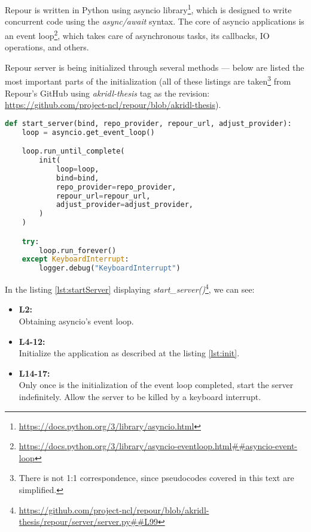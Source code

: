 \documentclass[../main.tex]{subfiles}
\begin{document}
Repour is written in Python using asyncio library\footnote{\url{https://docs.python.org/3/library/asyncio.html}}, which is designed to write concurrent code using the \textit{async/await} syntax. The core of asyncio applications is an event loop\footnote{\url{https://docs.python.org/3/library/asyncio-eventloop.html##asyncio-event-loop}}, which takes care of asynchronous tasks, its callbacks, IO operations, and others.

Repour server is being initialized through several methods — below are listed the most important parts of the initialization (all of these listings are taken\footnote{There is not 1:1 correspondence, since pseudocodes covered in this text are simplified.} from Repour's GitHub using \textit{akridl-thesis} tag as the revision: \url{https://github.com/project-ncl/repour/blob/akridl-thesis}).

\begin{lstlisting}[language=Python, caption=Server initialization: \textit{start\_server} method, label={lst:startServer}]
def start_server(bind, repo_provider, repour_url, adjust_provider):
    loop = asyncio.get_event_loop()

    loop.run_until_complete(
        init(
            loop=loop,
            bind=bind,
            repo_provider=repo_provider,
            repour_url=repour_url,
            adjust_provider=adjust_provider,
        )
    )

    try:
        loop.run_forever()
    except KeyboardInterrupt:
        logger.debug("KeyboardInterrupt")
\end{lstlisting}

In the listing \ref{lst:startServer} displaying \textit{start\_server()}\footnote{\url{https://github.com/project-ncl/repour/blob/akridl-thesis/repour/server/server.py##L99}}, we can see:
\begin{itemize}
    \item \textbf{L2:}\\
    Obtaining asyncio's event loop.

    \item \textbf{L4-12:}\\
    Initialize the application as described at the listing \ref{lst:init}.

    \item \textbf{L14-17:}\\
    Only once is the initialization of the event loop completed, start the server indefinitely. Allow the server to be killed by a keyboard interrupt.
\end{itemize}
\end{document}
